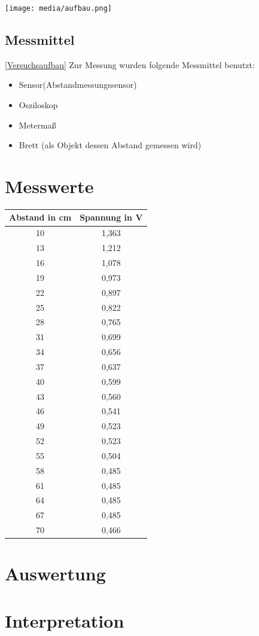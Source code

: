 	\texttt{[image: media/aufbau.png]}
	\label{Versuchsaufbau}

	
\subsection*{Messmittel}
\ref{Versuchsaufbau}
	Zur Messung wurden folgende Messmittel benutzt:
	\begin{itemize}
		\item Sensor(Abstandmessungssensor)
		\item Osziloskop		
		\item Metermaß
		\item Brett (als Objekt dessen Abstand gemessen wird)
	\end{itemize}

\section{Messwerte}
\label{chap:VERSUCH_1_MESSWERTE}
	\begin{tabular}{|c|c|}
	\hline 
	Abstand in cm & Spannung in V \\ 
	\hline 
	10  & 1,363 \\ 
	\hline 
	13 & 1,212 \\ 
	\hline 
	16 & 1,078 \\ 
	\hline 
	19 & 0,973 \\ 
	\hline 
	22 & 0,897 \\ 
	\hline 
	25 & 0,822 \\ 
	\hline 
	28 & 0,765 \\ 
	\hline 
	31 & 0,699 \\ 
	\hline 
	34 & 0,656 \\ 
	\hline 
	37 & 0,637 \\ 
	\hline 
	40 & 0,599 \\ 
	\hline 
	43 & 0,560 \\ 
	\hline 
	46 & 0,541 \\ 
	\hline 
	49 & 0,523 \\ 
	\hline 
	52 & 0,523 \\ 
	\hline 
	55 & 0,504 \\ 
	\hline 
	58 & 0,485 \\ 
	\hline 
	61 & 0,485 \\ 
	\hline 
	64 & 0,485 \\ 
	\hline 
	67 & 0,485 \\ 
	\hline 
	70 & 0,466 \\ 
	\hline 
	\end{tabular} 
	\label{WerteHand}

	
	

\section{Auswertung}
\label{chap:VERSUCH_1_AUSWERTUNG}
	
	
\section{Interpretation}
\label{chap:VERSUCH_1_INTERPRETATION}
